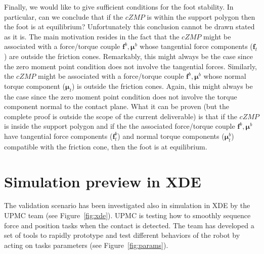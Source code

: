 \documentclass[12pt,a4paper,twoside]{article}
\begin{document}
Finally, we would like to give sufficient conditions for the foot stability. In particular, can we conclude that if the $cZMP$ is within the support polygon then the foot is at equilibrium? Unfortunately this conclusion cannot be drawn stated as it is. The main motivation resides in the fact that the $cZMP$ might be associated with a force/torque couple $\boldsymbol f^b, \boldsymbol\mu^b$ whose tangential force components ($\boldsymbol f_t$) are outside the friction cones. Remarkably, this might always be the case since the zero moment point condition does not involve the tangential forces. Similarly,  the $cZMP$ might be associated with a force/torque couple $\boldsymbol f^b, \boldsymbol\mu^b$ whose normal torque component ($\boldsymbol \mu_t$) is outside the friction cones. Again, this might always be the case since the zero moment point condition does not involve the torque component normal to the contact plane. What it can be proven (but the complete proof is outside the scope of the current deliverable) is that if the $cZMP$ is inside the support polygon and if the the associated force/torque couple $\boldsymbol f^b, \boldsymbol\mu^b$ have tangential force components ($\boldsymbol f^b_t$) and normal torque components ($\boldsymbol \mu^b_t$) compatible with the friction cone, then the foot is at equilibrium.


\section{Simulation preview in XDE}

The validation scenario has been investigated also in simulation in XDE by the UPMC team (see Figure~\ref{fig:xde}). UPMC is testing how to smoothly sequence force and position tasks when the contact is detected. The team has developed a set of tools to rapidly prototype and test different behaviors of the robot by acting on tasks parameters (see Figure~\ref{fig:params}).
\end{document}
